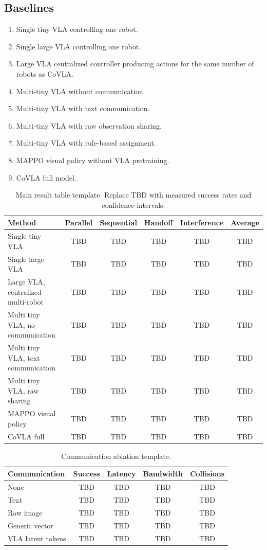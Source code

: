 \documentclass[11pt]{article}
\newcommand{\method}{CoVLA}
\begin{document}
\subsection{Baselines}
\begin{enumerate}
    \item Single tiny VLA controlling one robot.
    \item Single large VLA controlling one robot.
    \item Large VLA centralized controller producing actions for the same number of robots as \method{}.
    \item Multi-tiny VLA without communication.
    \item Multi-tiny VLA with text communication.
    \item Multi-tiny VLA with raw observation sharing.
    \item Multi-tiny VLA with rule-based assignment.
    \item MAPPO visual policy without VLA pretraining.
    \item \method{} full model.
\end{enumerate}

\begin{table}[t]
\centering
\caption{Main result table template. Replace TBD with measured success rates and confidence intervals.}
\label{tab:main}
\begin{tabular}{lccccc}
\toprule
Method & Parallel & Sequential & Handoff & Interference & Average \\
\midrule
Single tiny VLA & TBD & TBD & TBD & TBD & TBD \\
Single large VLA & TBD & TBD & TBD & TBD & TBD \\
Large VLA, centralized multi-robot & TBD & TBD & TBD & TBD & TBD \\
Multi tiny VLA, no communication & TBD & TBD & TBD & TBD & TBD \\
Multi tiny VLA, text communication & TBD & TBD & TBD & TBD & TBD \\
Multi tiny VLA, raw sharing & TBD & TBD & TBD & TBD & TBD \\
MAPPO visual policy & TBD & TBD & TBD & TBD & TBD \\
\method{} full & TBD & TBD & TBD & TBD & TBD \\
\bottomrule
\end{tabular}
\end{table}

\begin{table}[t]
\centering
\caption{Communication ablation template.}
\label{tab:comm}
\begin{tabular}{lcccc}
\toprule
Communication & Success & Latency & Bandwidth & Collisions \\
\midrule
None & TBD & TBD & TBD & TBD \\
Text & TBD & TBD & TBD & TBD \\
Raw image & TBD & TBD & TBD & TBD \\
Generic vector & TBD & TBD & TBD & TBD \\
VLA latent tokens & TBD & TBD & TBD & TBD \\
\bottomrule
\end{tabular}
\end{table}
\end{document}
